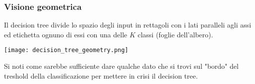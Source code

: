 \subsubsection{Visione geometrica}
Il decision tree divide lo spazio degli input in rettagoli con i lati paralleli agli assi  ed etichetta ognuno di essi con una delle $K$ classi (foglie dell'albero).
\begin{center}
	\texttt{[image: decision\_tree\_geometry.png]}
\end{center}
Si noti come sarebbe sufficiente dare qualche dato che si trovi sul "bordo" del treshold della classificazione per mettere in crisi il decision tree.